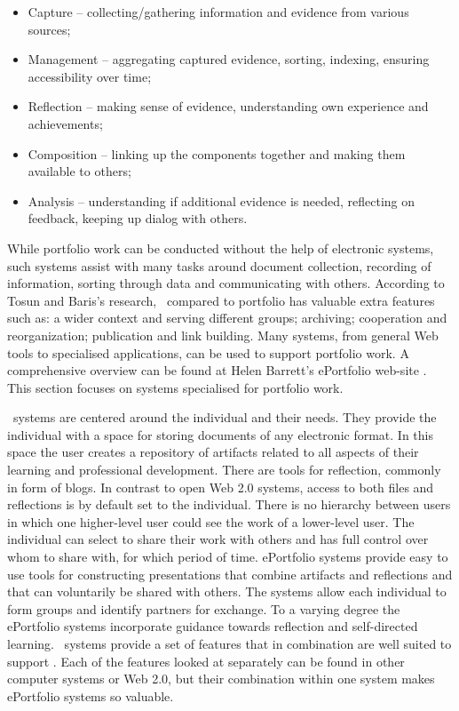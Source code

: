 \begin{itemize}
  \item Capture -- collecting/gathering information and evidence from various
  sources;
  \item Management -- aggregating captured evidence, sorting, indexing, ensuring
  accessibility over time;
  \item Reflection -- making sense of evidence, understanding own experience and
  achievements;
  \item Composition -- linking up the components together and making them
  available to others;
  \item Analysis -- understanding if additional evidence is needed, reflecting
  on feedback, keeping up dialog with others.
\end{itemize}

While portfolio work can be conducted without the help of electronic systems,
such systems assist with many tasks around document collection, recording of
information, sorting through data and communicating with others. According
to Tosun and Baris's \citeyearpar{Tosun2011} research, \ep~compared to portfolio
has valuable extra features such as: a wider context and serving different
groups; archiving; cooperation and reorganization; publication and link building.
Many systems, from general Web tools to specialised applications, can be used to
support portfolio work. A comprehensive overview can be found at Helen Barrett's
ePortfolio web-site \citep{Barrett2008}. This section focuses on systems
specialised for portfolio work.

\ep~systems are centered around the individual and their needs. They provide the
individual with a space for storing documents of any electronic format. In this
space the user creates a repository of artifacts related to all aspects of their
learning and professional development. There are tools for reflection, commonly
in form of blogs. In contrast to open Web 2.0 systems, access to both files and
reflections is by default set to the individual. There is no hierarchy between
users in which one higher-level user could see the work of a lower-level user.
The individual can select to share their work with others and has full control
over whom to share with, for which period of time. ePortfolio systems provide
easy to use tools for constructing presentations that combine artifacts and
reflections and that can voluntarily be shared with others. The systems allow
each individual to form groups and identify partners for exchange. To a varying
degree the ePortfolio systems incorporate guidance towards reflection and
self-directed learning. \ep~systems provide a set of features that in
combination are well suited to support \LLLsn. Each of the features looked at
separately can be found in other computer systems or Web 2.0, but their
combination within one system makes ePortfolio systems so valuable.

